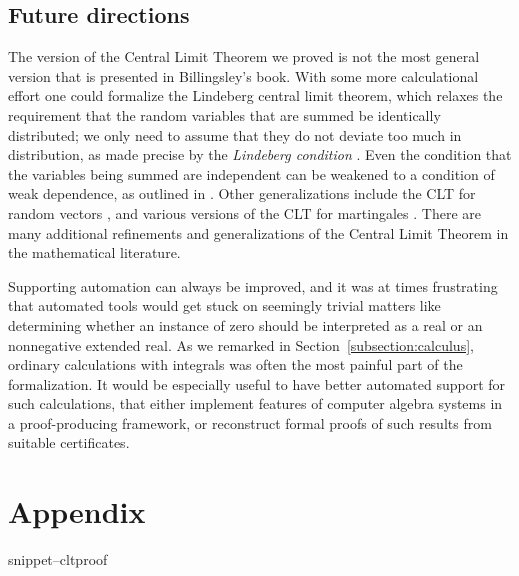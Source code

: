 \documentclass{svjour3}
\newcommand{\Snippet}[1]{\csname snippet--#1\endcsname}
\begin{document}
\subsection{Future directions}

The version of the Central Limit Theorem we proved is not the most general version that is presented in Billingsley's book. With some more calculational effort one could formalize the Lindeberg central limit theorem, which relaxes the requirement that the random variables that are summed be identically distributed; we only need to assume that they do not deviate too much in distribution, as made precise by the {\em Lindeberg condition} \cite[p.~359]{billingsley:95}. Even the condition that the variables being summed are independent can be weakened to a condition of weak dependence, as outlined in \cite[p.~363]{billingsley:95}. Other generalizations include the CLT for random vectors \cite[p.~385]{billingsley:95}, and various versions of the CLT for martingales \cite[pp.~475--478]{billingsley:95}. There are many additional refinements and generalizations of the Central Limit Theorem in the mathematical literature.

Supporting automation can always be improved, and it was at times frustrating that automated tools would get stuck on seemingly trivial matters like determining whether an instance of zero should be interpreted as a real or an nonnegative extended real. As we remarked in Section~\ref{subsection:calculus}, ordinary calculations with integrals was often the most painful part of the formalization. It would be especially useful to have better automated support for such calculations, that either implement features of computer algebra systems in a proof-producing framework, or reconstruct formal proofs of such results from suitable certificates.




\section*{Appendix}

\Snippet{cltproof}
\end{document}
